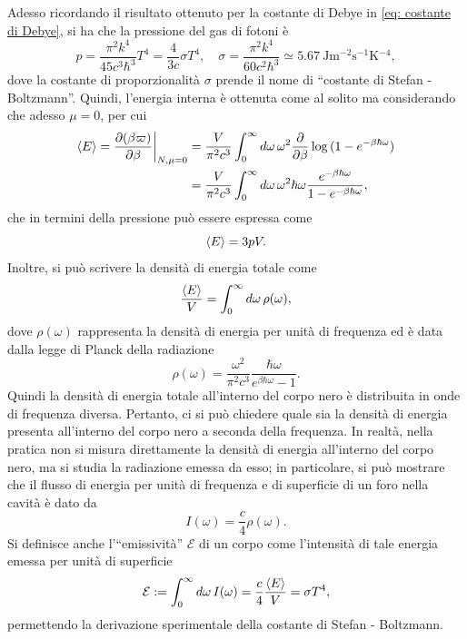 Adesso ricordando il risultato ottenuto per la costante di Debye in \eqref{eq: costante di Debye}, si ha che la pressione del gas di fotoni è
\begin{equation}
\label{eq: pressione gas di fotoni}
    p = \frac{\pi^2k^4}{45c^3\hbar^3}T^4 = \frac{4}{3c}\sigma T^4,\quad \sigma = \frac{\pi^2k^4}{60c^2\hbar^3} \simeq \SI{5.67}{\joule\meter^{-2}\second^{-1}\kelvin^{-4}},
\end{equation}
dove la costante di proporzionalità $\sigma$ prende il nome di ``costante di Stefan - Boltzmann''. Quindi, l'energia interna è ottenuta come al solito ma considerando che adesso $\mu = 0$, per cui
\begin{equation}
    \begin{split}
        \langle E \rangle = \frac{\partial(\beta\varpi)}{\partial\beta}\bigg|_{N,\mu = 0} &= \frac{V}{\pi^2c^3}\int_0^\infty d\omega\,\omega^2\frac{\partial}{\partial\beta}\log{(1 - e^{-\beta\hbar\omega})} \\
        &= \frac{V}{\pi^2c^3}\int_0^\infty d\omega\,\omega^2\hbar\omega\frac{e^{-\beta\hbar\omega}}{1 - e^{-\beta\hbar\omega}},
    \end{split}
\end{equation}
che in termini della pressione può essere espressa come
\begin{equation}
    \langle E \rangle = 3pV.
\end{equation}
Inoltre, si può scrivere la densità di energia totale come
\begin{equation}
    \frac{\langle E \rangle}{V} = \int_0^\infty d\omega\,\rho(\omega),
\end{equation}
dove $\rho(\omega)$ rappresenta la densità di energia per unità di frequenza ed è data dalla legge di Planck della radiazione
\begin{equation}
    \rho(\omega) = \frac{\omega^2}{\pi^2c^3}\frac{\hbar\omega}{e^{\beta\hbar\omega} - 1}.
\end{equation}
Quindi la densità di energia totale all'interno del corpo nero è distribuita in onde di frequenza diversa. Pertanto, ci si può chiedere quale sia la densità di energia presenta all'interno del corpo nero a seconda della frequenza. In realtà, nella pratica non si misura direttamente la densità di energia all'interno del corpo nero, ma si studia la radiazione emessa da esso; in particolare, si può mostrare che il flusso di energia per unità di frequenza e di superficie di un foro nella cavità è dato da
\begin{equation}
    I(\omega) = \frac{c}{4}\rho(\omega).
\end{equation}
Si definisce anche l'``emissività'' $\mathcal{E}$ di un corpo come l'intensità di tale energia emessa per unità di superficie 
\begin{equation}
    \mathcal{E} := \int_0^\infty d\omega\,I(\omega) = \frac{c}{4}\frac{\langle E \rangle}{V} = \sigma T^4,
\end{equation}
permettendo la derivazione sperimentale della costante di Stefan - Boltzmann.

